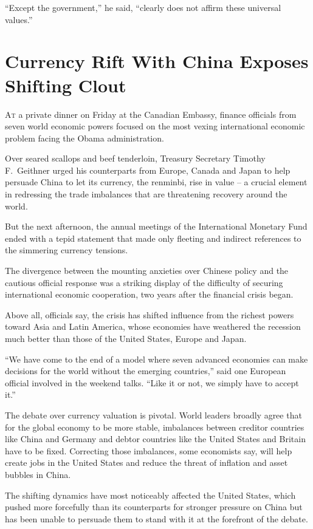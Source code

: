 ﻿\documentclass[12pt]{article}
\begin{document}
``Except the government,'' he said, ``clearly does not affirm these universal values.''

\section{Currency Rift With China Exposes Shifting Clout}

\lettrine{A}{t} a private dinner on Friday at the Canadian Embassy, finance
officials from seven world economic powers focused on the most vexing international economic problem
facing the Obama administration.

Over seared scallops and beef tenderloin, Treasury Secretary Timothy F.~Geithner urged his
counterparts from Europe, Canada and Japan to help persuade China to let its currency, the renminbi,
rise in value -- a crucial element in redressing the trade imbalances that are threatening recovery
around the world.

But the next afternoon, the annual meetings of the International Monetary Fund ended with a tepid
statement that made only fleeting and indirect references to the simmering currency tensions.

The divergence between the mounting anxieties over Chinese policy and the cautious official response
was a striking display of the difficulty of securing international economic cooperation, two years
after the financial crisis began.

Above all, officials say, the crisis has shifted influence from the richest powers toward Asia and
Latin America, whose economies have weathered the recession much better than those of the United
States, Europe and Japan.

``We have come to the end of a model where seven advanced economies can make decisions for the world
without the emerging countries,'' said one European official involved in the weekend talks. ``Like
it or not, we simply have to accept it.''

The debate over currency valuation is pivotal. World leaders broadly agree that for the global
economy to be more stable, imbalances between creditor countries like China and Germany and debtor
countries like the United States and Britain have to be fixed. Correcting those imbalances, some
economists say, will help create jobs in the United States and reduce the threat of inflation and
asset bubbles in China.

The shifting dynamics have most noticeably affected the United States, which pushed more forcefully
than its counterparts for stronger pressure on China but has been unable to persuade them to stand
with it at the forefront of the debate.
\end{document}
